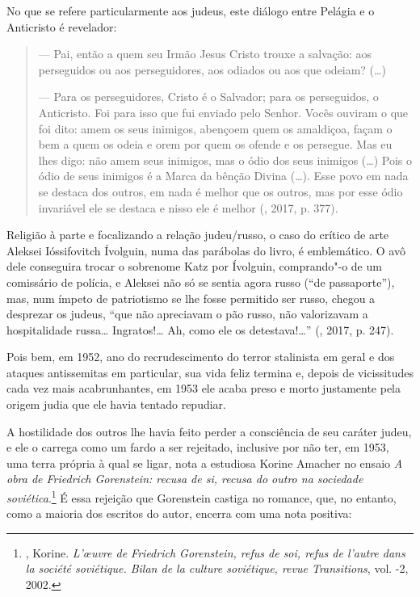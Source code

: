 No que se refere particularmente aos judeus, este diálogo entre Pelágia
e o Anticristo é revelador:

\begin{quotation}
--- Pai, então a quem seu Irmão Jesus Cristo trouxe a salvação: aos perseguidos ou aos perseguidores, aos odiados ou aos que odeiam? (\ldots{})

--- Para os perseguidores, Cristo é o Salvador; para os perseguidos, o
Anticristo. Foi para isso que fui enviado pelo Senhor. Vocês
ouviram o que foi dito: amem os seus inimigos, abençoem quem os
amaldiçoa, façam o bem a quem os odeia e orem por quem os ofende
e os persegue. Mas eu lhes digo: não amem seus inimigos, mas o ódio dos
seus inimigos (\ldots{}) Pois o ódio de seus inimigos é a Marca da bênção Divina
(\ldots{}). Esse povo em nada se destaca dos outros, em nada é
melhor que os outros, mas por esse ódio invariável ele se destaca e nisso ele é melhor
(, 2017, p. 377).
\end{quotation}

Religião à parte e focalizando a relação judeu/russo, o caso do crítico de arte Aleksei Ióssifovitch
Ívolguin, numa das parábolas do livro, é emblemático. O avô dele conseguira trocar o sobrenome Katz por
Ívolguin, comprando"-o de um comissário de polícia, e Aleksei não só se sentia agora
russo (``de passaporte''), mas, num ímpeto de patriotismo se lhe
fosse permitido ser russo, chegou a desprezar os judeus,
``que não apreciavam o pão russo, não valorizavam a hospitalidade russa\ldots{} Ingratos!\ldots{}
Ah, como ele os detestava!\ldots{}'' (, 2017, p. 247).

Pois bem, em 1952, ano do recrudescimento do terror stalinista em geral
e dos ataques antissemitas em particular, sua vida feliz termina e,
depois de vicissitudes cada vez mais acabrunhantes, em 1953 ele acaba
preso e morto justamente pela origem judia que ele havia tentado
repudiar.

A hostilidade dos outros lhe havia feito perder a consciência de seu
caráter judeu, e ele o carrega como um fardo a ser rejeitado,
inclusive por não ter, em 1953, uma terra própria à qual se ligar, nota
a estudiosa Korine Amacher no ensaio \emph{A obra de Friedrich
Gorenstein: recusa de si, recusa do outro na sociedade 
soviética}.\footnote{, Korine. \emph{L’œuvre de
 Friedrich Gorenstein, refus de soi, refus de l'autre dans la société
 soviétique. Bilan de la culture soviétique, revue Transitions}, vol.
 -2, 2002.} É essa rejeição que Gorenstein castiga no romance, que, no entanto, como a maioria dos escritos do autor, encerra com
uma nota positiva: 

